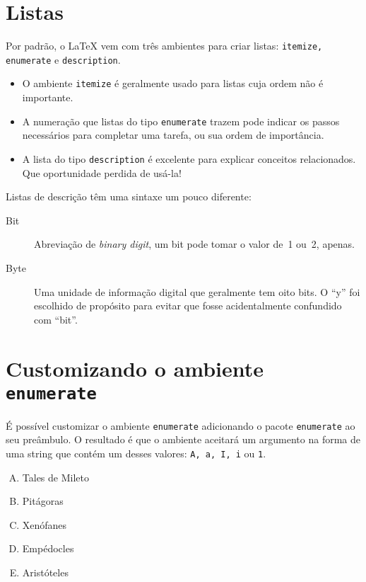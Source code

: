 \documentclass[a4paper,oneside]{article}
\begin{document}
\frenchspacing

\section{Listas}

Por padrão, o \LaTeX{} vem com três ambientes para criar listas:
\texttt{itemize, enumerate} e \texttt{description}.

\begin{itemize}
  \item O ambiente \texttt{itemize} é geralmente usado para listas cuja ordem
    não é importante.
  \item A numeração que listas do tipo \texttt{enumerate} trazem pode indicar
    os passos necessários para completar uma tarefa, ou sua ordem de
    importância.
  \item A lista do tipo \texttt{description} é excelente para explicar
    conceitos relacionados. Que oportunidade perdida de usá-la!
\end{itemize}

Listas de descrição têm uma sintaxe um pouco diferente:

\begin{description}
  \item[Bit] Abreviação de \emph{binary digit}, um bit pode tomar o valor de~1
    ou~2, apenas.
  \item[Byte] Uma unidade de informação digital que geralmente tem oito bits. O
    “y” foi escolhido de propósito para evitar que fosse acidentalmente
    confundido com “bit”.
\end{description}

\section{Customizando o ambiente \texttt{enumerate}}

É possível customizar o ambiente \texttt{enumerate} adicionando o pacote
\texttt{enumerate} ao seu preâmbulo. O resultado é que o ambiente aceitará um
argumento na forma de uma string que contém um desses valores: \texttt{A,
a, I, i} ou \texttt{1}.

\begin{enumerate}[A)]
  \item Tales de Mileto
  \item Pitágoras
  \item Xenófanes
  \item Empédocles
  \item Aristóteles
\end{enumerate}
\end{document}
